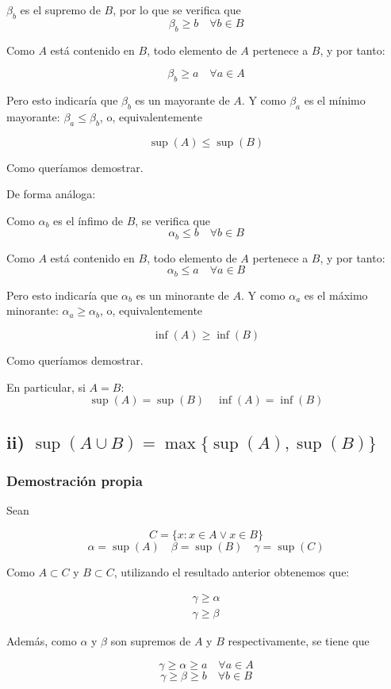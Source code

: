 \documentclass[11pt]{article}
\begin{document}
$\beta_b$ es el supremo de $B$, por lo que se verifica que
\[\beta_b \geq b \quad \forall b \in B\]

Como $A$ está contenido en $B$, todo elemento de $A$ pertenece
a $B$, y por tanto:

\[\beta_b \geq a \quad \forall a \in A\]

Pero esto indicaría que $\beta_b$ es un mayorante de $A$. Y como
$\beta_a$ es el mínimo mayorante: $\beta_a \leq \beta_b$,
o, equivalentemente

\[
\sup(A) \leq \sup(B)
\]

Como queríamos demostrar.

De forma análoga:

Como $\alpha_b$ es el ínfimo de $B$, se verifica que
\[
\alpha_b \leq b \quad \forall b \in B
\]

Como $A$ está contenido en $B$, todo elemento de $A$ pertenece
a $B$, y por tanto:
\[
\alpha_b \leq a \quad \forall a \in B
\]

Pero esto indicaría que $\alpha_b$ es un minorante de $A$. Y
como $\alpha_a$ es el máximo minorante: $\alpha_a \geq \alpha_b$,
o, equivalentemente

\[
\inf(A) \geq \inf(B)
\]

Como queríamos demostrar.

En particular, si $A=B$:
\[
\sup(A) = \sup(B) \quad \inf(A) = \inf(B)
\]

\subsection{ii) $\sup(A\cup B) = \max\{\sup(A), \sup(B)\}$}
\label{sec-2-2}
\subsubsection{Demostración propia}
\label{sec-2-2-1}
Sean

\[C=\{x: x \in A \lor x \in B\}\]
\[\alpha = \sup(A) \quad \beta = \sup(B) \quad \gamma = \sup(C)\]

Como $A \subset C$ y $B \subset C$, utilizando el resultado
anterior obtenemos que:

\begin{align*}
\gamma \geq \alpha \\
\gamma \geq \beta
\end{align*}

Además, como $\alpha$ y $\beta$ son supremos
de $A$ y $B$ respectivamente, se tiene que

\[
\gamma \geq \alpha \geq a \quad \forall a \in A
\]
\[
\gamma \geq \beta \geq b \quad \forall b \in B
\]
\end{document}
